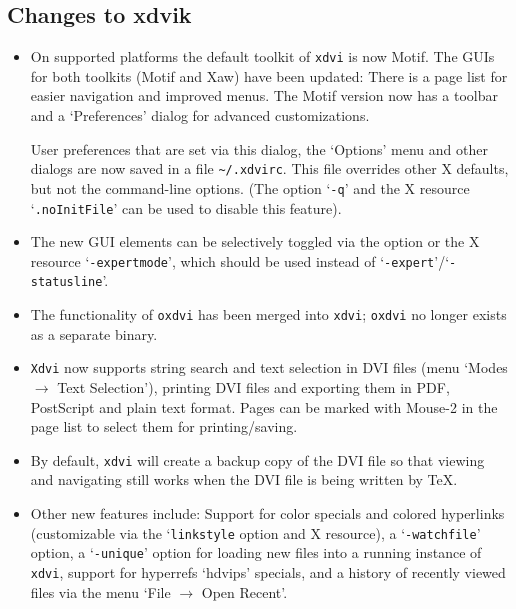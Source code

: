 \documentclass[11pt,a4paper]{article}
\begin{document}
\subsection{Changes to xdvik}
\begin{itemize}
\item On supported platforms the default toolkit of \verb+xdvi+
   is now Motif. The GUIs for both toolkits (Motif and Xaw) have
   been updated: There is a page list for easier navigation and
   improved menus.  The Motif version now has a toolbar and a
   `Preferences' dialog for advanced customizations.

   User preferences that are set via this dialog, the `Options'
   menu and other dialogs are now saved in a file
   \verb+~/.xdvirc+. This file overrides other X defaults, but
   not the command-line options. (The option `\verb+-q+' and the X resource
   `\verb+.noInitFile+' can be used to disable
   this feature).

\item The new GUI elements can be selectively toggled via the
   option or the X resource `\verb+-expertmode+', which should be
   used instead of `\verb+-expert+'\slash`\verb+-statusline+'.

\item The functionality of \verb+oxdvi+ has been merged into
   \verb+xdvi+; \verb+oxdvi+ no longer exists as a separate binary.

\item \verb+Xdvi+ now supports string search and text selection
   in DVI files (menu `Modes $\rightarrow$ Text Selection'),
   printing DVI files and exporting them in PDF, PostScript and
   plain text format. Pages can be marked with Mouse-2 in the
   page list to select them for printing\slash saving.

\item By default, \verb+xdvi+ will create a backup copy of the
   DVI file so that viewing and navigating still works when the
   DVI file is being written by \TeX.

\item Other new features include: Support for color specials and
   colored hyperlinks (customizable via the `\verb+linkstyle+
   option and X resource), a `\verb+-watchfile+' option, a
   `\verb+-unique+' option for loading new files into a running
   instance of \verb+xdvi+, support for hyperrefs `hdvips'
   specials, and a history of recently viewed files via the menu
   `File $\rightarrow$ Open Recent'.
\end{itemize}
\end{document}

